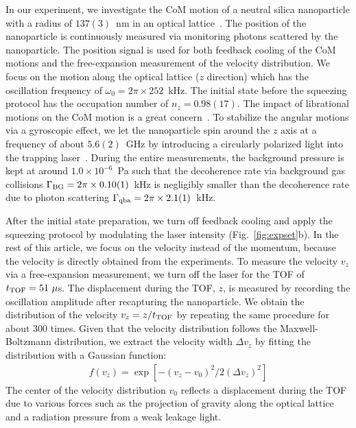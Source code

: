 \documentclass[aps, prl, 
amsmath, showpacs, preprintnumbers, twocolumn, amssymb, amsmath, superscriptaddress]{revtex4-1}
\begin{document}
In our experiment, we investigate the CoM motion of a neutral silica nanoparticle with a radius of $137(3)$~nm in an optical lattice~\cite{kamba2022optical,fnote10}. The position of the nanoparticle is continuously measured via monitoring photons scattered by the nanoparticle. The position signal is used for both feedback cooling of the CoM motions and the free-expansion measurement of the velocity distribution. We focus on the motion along the optical lattice ($z$ direction) which has the oscillation frequency of $\omega_0=2\pi \times 252$~kHz. The initial state before the squeezing protocol has the occupation number of $n_z=0.98(17)$. The impact of librational motions on the CoM motion is a great concern~\cite{kamba2023revealing}. To stabilize the angular motions via a gyroscopic effect, we let the nanoparticle spin around the $z$ axis at a frequency of about $5.6(2)$~GHz by introducing a circularly polarized light into the trapping laser~\cite{reimann2018ghz,ahn2018optically}. 
During the entire measurements, the background pressure is kept at around $1.0\times 10^{-6}$~Pa such that the decoherence rate via background gas collisions $\Gamma_{\rm BG}=2\pi \times 0.10(1)$~kHz is negligibly smaller than the decoherence rate due to photon scattering $\Gamma_{\rm qba}= 2\pi \times 2.1(1)$~kHz.

After the initial state preparation, we turn off feedback cooling and apply the squeezing protocol by modulating the laser intensity (Fig.~\ref{fig:expset}b). In the rest of this article, we focus on the velocity instead of the momentum, because the velocity is directly obtained from the experiments. To measure the velocity $v_z$ via a free-expansion measurement, we turn off  the laser for the TOF of $t_{\rm TOF} = 51~\mu$s. The displacement during the TOF, $z$, is measured by recording the oscillation amplitude after recapturing the nanoparticle. We obtain the distribution of the velocity $v_z=z/t_{\rm TOF}$ by repeating the same procedure for about 300 times. Given that the velocity distribution follows the Maxwell-Boltzmann distribution, we extract the velocity width $\Delta v_z$ by fitting the distribution with a Gaussian function:
\begin{eqnarray}
f(v_z) = \exp \left[-(v_z-v_0)^2/2(\Delta v_z)^2 \right] 
\label{eq:dist}
\end{eqnarray}
The center of the velocity distribution $v_0$ reflects a displacement during the TOF due to various forces such as the projection of gravity along the optical lattice and a radiation pressure from a weak leakage light. 
\end{document}
